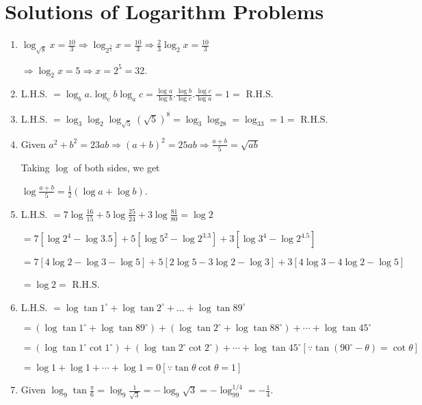 \chapter{Solutions of Logarithm Problems}
\begin{enumerate}
\item $\log_{\sqrt{8}}x = \frac{10}{3} \Rightarrow \log_{2^{\tfrac{3}{2}}}x = \frac{10}{3}\Rightarrow \frac{2}{3}\log_2x = \frac{10}{3}$

  $\Rightarrow \log_2x = 5 \Rightarrow x = 2^5 = 32.$
\item L.H.S. $= \log_ba.\log_cb\log_ac = \frac{\log a}{\log b}.\frac{\log b}{\log c}.\frac{\log c}{\log a} = 1 =$ R.H.S.
\item L.H.S. $= \log_3\log_2\log_{\sqrt{5}}(\sqrt{5})^8 = \log_3\log_28 = \log_33 = 1 =$ R.H.S.
\item Given $a^2 + b^2 = 23ab \Rightarrow (a + b)^2 = 25ab \Rightarrow \frac{a + b}{5} = \sqrt{ab}$

  Taking $\log$ of both sides, we get

  $\log\frac{a + b}{5} = \frac{1}{2}(\log a + \log b)$.
\item L.H.S. $= 7\log\frac{16}{15} + 5\log\frac{25}{24} + 3\log\frac{81}{80} = \log 2$

  $= 7[\log 2^4 - \log 3.5] + 5[\log 5^2 - \log 2^3.3] + 3[\log 3^4 - \log 2^4.5]$

  $= 7[4\log 2 - \log 3 - \log 5] + 5[2\log 5 - 3\log 2 - \log 3] + 3[4\log 3 - 4\log 2 - \log 5]$

  $= \log 2 =$ R.H.S.
\item L.H.S. $= \log\tan1^\circ + \log\tan2^\circ + \ldots + \log\tan89^\circ$

  $= (\log\tan1^\circ + \log\tan89^\circ) + (\log\tan2^\circ + \log\tan88^\circ) + \cdots + \log\tan45^\circ$

  $=(\log\tan1^\circ\cot1^\circ) + (\log\tan2^\circ\cot2^\circ) + \cdots + \log\tan45^\circ [\because \tan(90^\circ - \theta) = \cot\theta]$

  $= \log 1 + \log 1 + \cdots + \log 1 = 0 [\because \tan\theta\cot\theta = 1]$
\item Given $\log_9\tan\frac{\pi}{6} = \log_9\frac{1}{\sqrt{3}} = -\log_9\sqrt{3} = -\log_99^{1/4} = -\frac{1}{4}$.
\end{enumerate}
